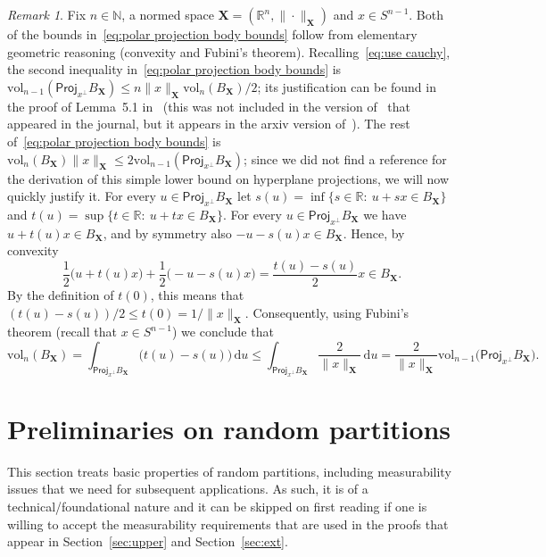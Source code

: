 \documentclass[11pt,reqno]{amsart}
\renewcommand{\le}{\leqslant}
\newcommand{\ud}[0]{\,\mathrm{d}}
\newcommand{\proj}{\mathsf{Proj}}
\newcommand{\X}{\mathbf X}
\newcommand{\R}{\mathbb R}
\theoremstyle{remark}
\newtheorem{remark}[theorem]{Remark}
\newcommand{\N}{\mathbb N}
\newcommand{\vol}{\mathrm{vol}}
\renewcommand{\1}{\mathbf 1}
\begin{document}
\begin{remark}\label{rem:volume of projection loose ends} Fix $n\in \N$, a normed space $\X=(\R^n,\|\cdot\|_\X)$ and $x\in S^{n-1}$. Both of the bounds in~\eqref{eq:polar projection body bounds} follow from elementary geometric reasoning (convexity and Fubini's theorem). Recalling~\eqref{eq:use cauchy}, the second inequality in~\eqref{eq:polar projection body bounds} is  $\vol_{n-1}(\proj_{x^{\perp}}B_\X)\le n\|x\|_\X\vol_n(B_\X)/2$; its justification can be found in the proof of Lemma~5.1 in~\cite{GNS12} (this was  not included in the version of~\cite{GNS12} that appeared in the journal, but it appears in the arxiv version of~\cite{GNS12}). The rest of~\eqref{eq:polar projection body bounds} is $\vol_n(B_\X)\|x\|_\X\le 2\vol_{n-1}(\proj_{x^{\perp}}B_\X)$; since we did not find a reference for the  derivation of this simple lower bound on hyperplane projections, we will now quickly justify it. For every $u\in \proj_{x^{\perp}}B_\X$ let $s(u)=\inf\{s\in \R:\ u+sx\in  B_\X\}$ and $t(u)=\sup\{t\in \R:\ u+tx\in  B_\X\}$. For every $u\in \proj_{x^{\perp}}B_\X$ we have $u+t(u)x\in B_\X$, and by symmetry also $-u-s(u)x\in B_\X$. Hence, by convexity $$
\frac12 \big(u+t(u)x\big)+\frac12 \big(-u-s(u)x\big)= \frac{t(u)-s(u)}{2}x\in B_\X.
$$ By the definition of $t(0)$, this means that $(t(u)-s(u))/2\le t(0)=1/\|x\|_\X$. Consequently, using Fubini's theorem (recall that $x\in S^{n-1}$) we conclude that
\begin{equation*}
\vol_n(B_\X)=\int_{\proj_{x^{\perp}}B_\X} \big(t(u)-s(u)\big)\ud u\le \int_{\proj_{x^{\perp}}B_\X}  \frac{2}{\|x\|_\X}\ud u= \frac{2}{\|x\|_\X}\vol_{n-1}\big(\proj_{x^{\perp}}B_\X\big).
\end{equation*}
\end{remark}












\section{Preliminaries on random partitions}\label{sec:prelim random part main}

This section treats basic properties of random partitions, including measurability issues that we need for subsequent applications. As such, it is of a technical/foundational nature and it can be skipped on first reading if one is willing to accept the  measurability requirements that are used in the proofs that appear in Section~\ref{sec:upper} and Section~\ref{sec:ext}.
\end{document}
